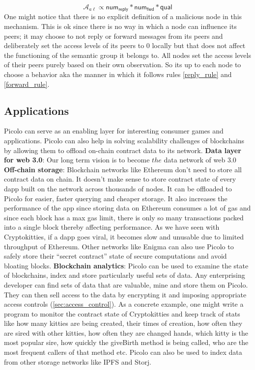 \newline
$$ \mathcal{A}_{a\ell} \propto \textsf{num}_\textsf{reply} * \textsf{num}_\textsf{fwd} * \textsf{qual}$$
One might notice that there is no explicit definition of a malicious node in this mechanism. This is ok since there is no way in which a node can influence its peers; it may choose to not reply or forward messages from its peers and deliberately set the access levels of its peers to 0 locally but that does not affect the functioning of the semantic group it belongs to. All nodes set the access levels of their peers purely based on their own observation. So its up to each node to choose a behavior aka the manner in which it follows rules \ref{reply_rule} and \ref{forward_rule}.

\subsection{Applications} \label{sect:applications}
\textsf{Picolo} can serve as an enabling layer for interesting consumer games and applications. \textsf{Picolo} can also help in solving scalability challenges of blockchains by allowing them to offload on-chain contract data to its network. 
\newline\newline
\textbf{Data layer for web 3.0}: Our long term vision is to become $the$ data network of web 3.0 
\newline\newline
\textbf{Off-chain storage}: Blockchain networks like Ethereum don't need to store all contract data on chain. It doesn't make sense to store contract state of every dapp built on the network across thousands of nodes. It can be offloaded to \textsf{Picolo} for easier, faster querying and cheaper storage. It also increases the performance of the app since storing data on Ethereum consumes a lot of gas and since each block has a max gas limit, there is only so many transactions packed into a single block thereby affecting performance. As we have seen with Cryptokitties, if a dapp goes viral, it becomes slow and unusable due to limited throughput of Ethereum. Other networks like Enigma \cite{enigma} can also use \textsf{Picolo} to safely store their ``secret contract'' state of secure computations and avoid bloating blocks.
\newline\newline
\textbf{Blockchain analytics}: \textsf{Picolo} can be used to examine the state of blockchains, index and store particularly useful sets of data. Any enterprising developer can find sets of data that are valuable, mine and store them on \textsf{Picolo}. They can then sell access to the data by encrypting it and imposing appropriate access controls (\cref{sec:access_control}). As a concrete example, one might write a program to monitor the contract state of Cryptokitties and keep track of stats like how many kitties are being created, their times of creation, how often they are sired with other kitties, how often they are changed hands, which kitty is the most popular sire, how quickly the \textsf{giveBirth} method is being called, who are the most frequent callers of that method etc. \textsf{Picolo} can also be used to index data from other storage networks like IPFS and Storj. 

